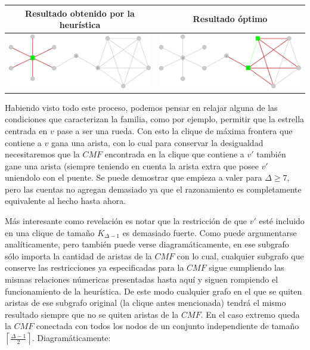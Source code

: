 \begin{tabular}{|c||c|}
	\hline
	Resultado obtenido por la heur\'istica & Resultado \'optimo \\
	\hline
	\includegraphics[scale = 0.18]{img/ej3/constructiva_golosa/vnotincmf_carac1_min_st01.png} &
	\includegraphics[scale = 0.18]{img/ej3/constructiva_golosa/vnotincmf_carac1_min_st11.png} \\
	\hline
\end{tabular}

\phantom{x}


Habiendo visto todo este proceso, podemos pensar en relajar alguna de las condiciones que 
caracterizan la familia, como por ejemplo, permitir que la estrella centrada en $v$ pase
a ser una rueda. Con esto la clique de m\'axima frontera que contiene a $v$ gana una arista, 
con lo cual para conservar la desigualdad necesitaremos que la $CMF$ encontrada
en la clique que contiene a $v'$ tambi\'en gane una arista (siempre teniendo en cuenta la
arista extra que posee $v'$ uniendolo con el puente. Se puede demostrar que empieza a
valer para $\Delta \geq 7$, pero las cuentas no agregan demasiado ya que el razonamiento
es completamente equivalente al hecho hasta ahora.

	
M\'as interesante como revelaci\'on es notar que la restricci\'on de que $v'$ est\'e
incluido en una clique de tama\~no $K_{\Delta -1}$ es demasiado fuerte. Como puede argumentarse
anal\'iticamente, pero tambi\'en puede verse diagram\'aticamente, en ese subgrafo s\'olo importa 
la cantidad de aristas de la $CMF$ con lo cual, cualquier subgrafo que conserve las restricciones
ya especificadas para la $CMF$ sigue cumpliendo las mismas relaciones n\'umericas presentadas
hasta aqu\'i y siguen rompiendo el funcionamiento de la heur\'istica. De este modo 
cualquier grafo en el que se quiten aristas de ese subgrafo original (la clique antes mencionada)
tendr\'a el mismo resultado siempre que no se quiten aristas de la $CMF$. En el caso extremo queda
la $CMF$ conectada con todos los nodos de un conjunto independiente de tama\~no 
$\left\lceil \frac{\Delta -1}{2} \right\rceil$. Diagram\'aticamente:

